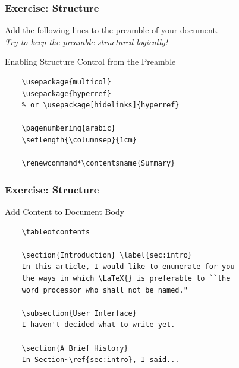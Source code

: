 

\begin{frame}[fragile]
\frametitle{Exercise: Structure}
Add the following lines to the preamble of your document. \\
\textit{\small Try to keep the preamble structured logically!}
\begin{alertblock}{Enabling Structure Control from the Preamble}
    \small
    \begin{verbatim}
    \usepackage{multicol}
    \usepackage{hyperref}
    % or \usepackage[hidelinks]{hyperref}
    
    \pagenumbering{arabic}
    \setlength{\columnsep}{1cm}

    \renewcommand*\contentsname{Summary}    
    \end{verbatim}
\end{alertblock}
\end{frame}


\begin{frame}[fragile]
\frametitle{Exercise: Structure} 
\begin{alertblock}{Add Content to Document Body}
    \small
    \begin{verbatim}
    \tableofcontents
    
    \section{Introduction} \label{sec:intro}
    In this article, I would like to enumerate for you 
    the ways in which \LaTeX{} is preferable to ``the 
    word processor who shall not be named."

    \subsection{User Interface}
    I haven't decided what to write yet.

    \section{A Brief History}
    In Section~\ref{sec:intro}, I said...
    \end{verbatim}
\end{alertblock}
\end{frame}


